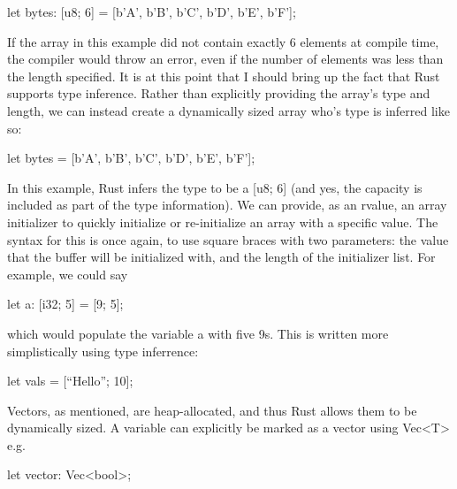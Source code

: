 \documentclass{article}
\begin{document}
\begin{rustlst}

let bytes: [u8; 6] = [b’A’, b’B’, b’C’, b’D’, b’E’, b’F’]; 

\end{rustlst}

If the array in this example did not contain exactly 6 elements at compile time, 
the compiler would throw an error, even if the number of elements was less than the length specified. 
It is at this point that I should bring up the fact that Rust supports type inference. Rather 
than explicitly providing the array’s type and length, we can instead create a dynamically sized array who’s 
type is inferred like so: 

\begin{rustlst}

let bytes = [b’A’, b’B’, b’C’, b’D’, b’E’, b’F’]; 

\end{rustlst}

In this example, Rust infers the type to be a [u8; 6] (and yes, the capacity is included 
as part of the type information). We can provide, as an rvalue, an array initializer to quickly 
initialize or re-initialize an array with a specific value. The syntax for this is once again, to use 
square braces with two parameters: the value that the buffer will be initialized with, and the length of 
the initializer list. For example, we could say 

\begin{rustlst}

let a: [i32; 5] = [9; 5]; 

\end{rustlst}
   
which would populate the variable a with five 9s. This is written more simplistically using type 
inferrence: 

\begin{rustlst}

let vals = [“Hello”; 10]; 

\end{rustlst}

Vectors, as mentioned, are heap-allocated, and thus Rust allows them to be dynamically sized. A variable can 
explicitly be marked as a vector using Vec<T> e.g. 

\begin{rustlst}

let vector: Vec<bool>; 

\end{rustlst}
\end{document}
